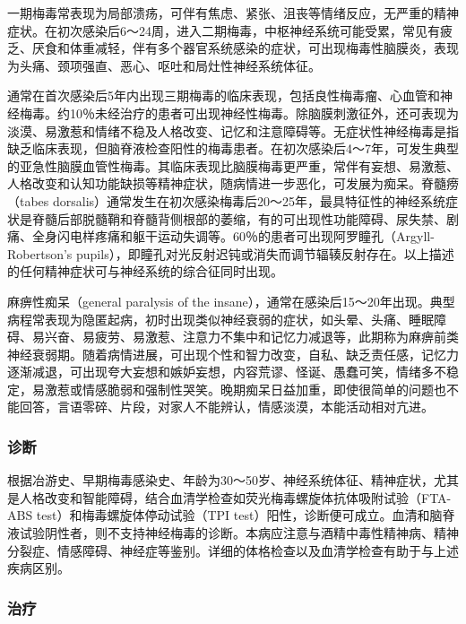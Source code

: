 一期梅毒常表现为局部溃疡，可伴有焦虑、紧张、沮丧等情绪反应，无严重的精神症状。在初次感染后6～24周，进入二期梅毒，中枢神经系统可能受累，常见有疲乏、厌食和体重减轻，伴有多个器官系统感染的症状，可出现梅毒性脑膜炎，表现为头痛、颈项强直、恶心、呕吐和局灶性神经系统体征。

通常在首次感染后5年内出现三期梅毒的临床表现，包括良性梅毒瘤、心血管和神经梅毒。约10％未经治疗的患者可出现神经性梅毒。除脑膜刺激征外，还可表现为淡漠、易激惹和情绪不稳及人格改变、记忆和注意障碍等。无症状性神经梅毒是指缺乏临床表现，但脑脊液检查阳性的梅毒患者。在初次感染后4～7年，可发生典型的亚急性脑膜血管性梅毒。其临床表现比脑膜梅毒更严重，常伴有妄想、易激惹、人格改变和认知功能缺损等精神症状，随病情进一步恶化，可发展为痴呆。脊髓痨（tabes
dorsalis）通常发生在初次感染梅毒后20～25年，最具特征性的神经系统症状是脊髓后部脱髓鞘和脊髓背侧根部的萎缩，有的可出现性功能障碍、尿失禁、剧痛、全身闪电样疼痛和躯干运动失调等。60％的患者可出现阿罗瞳孔（Argyll-Robertson's
pupils），即瞳孔对光反射迟钝或消失而调节辐辏反射存在。以上描述的任何精神症状可与神经系统的综合征同时出现。

麻痹性痴呆（general paralysis of the
insane），通常在感染后15～20年出现。典型病程常表现为隐匿起病，初时出现类似神经衰弱的症状，如头晕、头痛、睡眠障碍、易兴奋、易疲劳、易激惹、注意力不集中和记忆力减退等，此期称为麻痹前类神经衰弱期。随着病情进展，可出现个性和智力改变，自私、缺乏责任感，记忆力逐渐减退，可出现夸大妄想和嫉妒妄想，内容荒谬、怪诞、愚蠢可笑，情绪多不稳定，易激惹或情感脆弱和强制性哭笑。晚期痴呆日益加重，即使很简单的问题也不能回答，言语零碎、片段，对家人不能辨认，情感淡漠，本能活动相对亢进。

\subsubsection{诊断}

根据冶游史、早期梅毒感染史、年龄为30～50岁、神经系统体征、精神症状，尤其是人格改变和智能障碍，结合血清学检查如荧光梅毒螺旋体抗体吸附试验（FTA-ABS
test）和梅毒螺旋体停动试验（TPI
test）阳性，诊断便可成立。血清和脑脊液试验阴性者，则不支持神经梅毒的诊断。本病应注意与酒精中毒性精神病、精神分裂症、情感障碍、神经症等鉴别。详细的体格检查以及血清学检查有助于与上述疾病区别。

\subsubsection{治疗}


